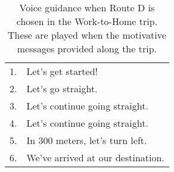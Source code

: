 \begin{table}[h]
\centering
\caption{Voice guidance when Route D is chosen in the Work-to-Home trip. These are played when the motivative messages provided along the trip.}~\label{tab:c-motiv-D}
\begin{tabular}{ll}
\hline
1. & Let's get started!                \\
2. & Let's go straight.                \\
3. & Let's continue going straight.    \\
4. & Let's continue going straight.    \\
5. & In 300 meters, let's turn left.   \\
6. & We've arrived at our destination. \\ \hline
\end{tabular}
\end{table}